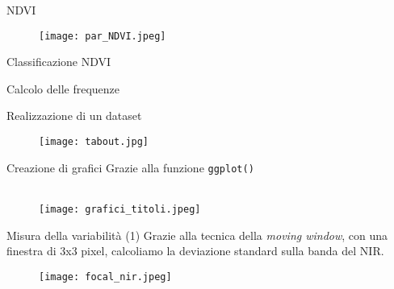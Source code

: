 \documentclass{beamer} %
\begin{document}
        
\begin{frame}{NDVI}

\begin{figure}
    \centering
    \texttt{[image: par\_NDVI.jpeg]}
\end{figure}
 \end{frame}
 
\begin{frame}{Classificazione NDVI}
    
\end{frame}

\begin{frame}{Calcolo delle frequenze}
     
\end{frame}

\begin{frame}{Realizzazione di un dataset}
     
    \begin{figure}
        \centering
        \texttt{[image: tabout.jpg]}
    \end{figure}
\end{frame}

\begin{frame}{Creazione di grafici}
Grazie alla funzione \texttt{ggplot()}
\\
\\
    \begin{figure}
        \centering
        \texttt{[image: grafici\_titoli.jpeg]}
    \end{figure}
\end{frame}

\begin{frame}{Misura della variabilità (1)}
Grazie alla tecnica della \textit{moving window}, con una finestra di 3x3 pixel, calcoliamo
la deviazione standard sulla banda del NIR.
\bigskip
    
    \begin{figure}
        \centering
        \texttt{[image: focal\_nir.jpeg]}
    \end{figure}
\end{frame}
\end{document}
